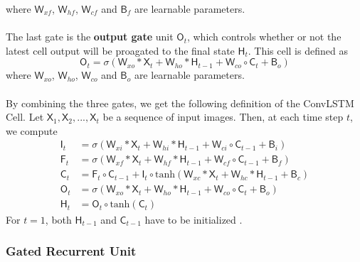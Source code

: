 \documentclass[./main.tex]{subfiles}
\begin{document}
where $\mathsf{W}_{xf}$, $\mathsf{W}_{hf}$, $\mathsf{W}_{cf}$ and $\mathsf{B}_f$ are learnable parameters.
\\
\\
The last gate is the \textbf{output gate} unit $\mathsf{O}_t$, which controls whether or not the latest cell output will be proagated to the final state $\mathsf{H}_t$. This cell is defined as
\begin{equation}
    \mathsf{O}_t = \sigma \left( \mathsf{W}_{xo} * \mathsf{X}_t + \mathsf{W}_{ho} * \mathsf{H}_{t - 1} + \mathsf{W}_{co} \circ \mathsf{C}_t + \mathsf{B}_o \right)
\end{equation}
where $\mathsf{W}_{xo}$, $\mathsf{W}_{ho}$, $\mathsf{W}_{co}$ and $\mathsf{B}_o$ are learnable parameters.
\\
\\
By combining the three gates, we get the following definition of the ConvLSTM Cell.
Let $\mathsf{X}_1, \mathsf{X}_2, ..., \mathsf{X}_t$ be a sequence of input images. Then, at each time step $t$, we compute
\begin{align}
    \mathsf{I}_t &= \sigma \left( \mathsf{W}_{xi} * \mathsf{X}_t + \mathsf{W}_{hi} * \mathsf{H}_{t - 1} + \mathsf{W}_{ci} \circ \mathsf{C}_{t - 1} + \mathsf{B}_i \right) \\
    \mathsf{F}_t &= \sigma \left( \mathsf{W}_{xf} * \mathsf{X}_t + \mathsf{W}_{hf} * \mathsf{H}_{t - 1} + \mathsf{W}_{cf} \circ \mathsf{C}_{t - 1} + \mathsf{B}_f \right) \\
    \mathsf{C}_t &= \mathsf{F}_t \circ \mathsf{C}_{t - 1} + \mathsf{I}_t \circ \text{tanh} \left( \mathsf{W}_{xc} * \mathsf{X}_t + \mathsf{W}_{hc} * \mathsf{H}_{t - 1} + \mathsf{B}_c \right) \\
    \mathsf{O}_t &= \sigma \left( \mathsf{W}_{xo} * \mathsf{X}_t + \mathsf{W}_{ho} * \mathsf{H}_{t - 1} + \mathsf{W}_{co} \circ \mathsf{C}_t + \mathsf{B}_o \right) \\
    \mathsf{H}_t &= \mathsf{O}_t \circ \text{tanh}(\mathsf{C}_t)
\end{align}
For $t = 1$, both $\mathsf{H}_{t - 1}$ and $\mathsf{C}_{t - 1}$ have to be initialized \cite{conv_lstm}.

\subsubsection{Gated Recurrent Unit}
\end{document}
